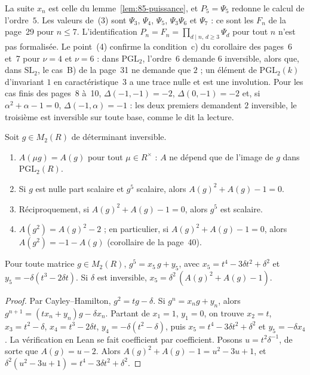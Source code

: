 \begin{remarque}
La suite $x_n$ est celle du lemme~\ref{lem:85-puissance}, et $P_5 = \Psi_5$ redonne le calcul de l'ordre~$5$. Les valeurs de~(3) sont $\Psi_3$, $\Psi_4$, $\Psi_5$, $\Psi_3\Psi_6$ et $\Psi_7$ : ce sont les $F_n$ de la page~29 pour $n \leq 7$. L'identification $P_n = F_n = \prod_{d \mid n,\, d \geq 3}\Psi_d$ pour tout $n$ n'est pas formalisée. Le point~(4) confirme la condition~c) du corollaire des pages~6 et~7 pour $\nu = 4$ et $\nu = 6$ : dans $\mathrm{PGL}_2$, l'ordre~$6$ demande $6$ inversible, alors que, dans $\mathrm{SL}_2$, le cas~B) de la page~31 ne demande que $2$ ; un élément de $\mathrm{PGL}_2(k)$ d'invariant $1$ en caractéristique~$3$ a une trace nulle et est une involution. Pour les cas finis des pages~8 à~10, $\Delta(-1, -1) = -2$, $\Delta(0, -1) = -2$ et, si $\alpha^2 + \alpha - 1 = 0$, $\Delta(-1, \alpha) = -1$ : les deux premiers demandent $2$ inversible, le troisième est inversible sur toute base, comme le dit la lecture.
\end{remarque}

\begin{enonce}
Soit $g \in M_2(R)$ de déterminant inversible.
\begin{enumerate}
\item $A(\mu g) = A(g)$ pour tout $\mu \in R^\times$ : $A$ ne dépend que de l'image de $g$ dans $\mathrm{PGL}_2(R)$.
\item Si $g$ est nulle part scalaire et $g^5$ scalaire, alors $A(g)^2 + A(g) - 1 = 0$.
\item Réciproquement, si $A(g)^2 + A(g) - 1 = 0$, alors $g^5$ est scalaire.
\item $A(g^2) = A(g)^2 - 2$ ; en particulier, si $A(g)^2 + A(g) - 1 = 0$, alors $A(g^2) = -1 - A(g)$ (corollaire de la page~40).
\end{enumerate}
\end{enonce}

\begin{lemme}\label{lem:85-puissance}
Pour toute matrice $g \in M_2(R)$, $g^5 = x_5\, g + y_5$, avec $x_5 = t^4 - 3\delta t^2 + \delta^2$ et $y_5 = -\delta(t^3 - 2\delta t)$. Si $\delta$ est inversible, $x_5 = \delta^2\,(A(g)^2 + A(g) - 1)$.
\end{lemme}

\begin{proof}
Par Cayley--Hamilton, $g^2 = t g - \delta$. Si $g^n = x_n g + y_n$, alors $g^{n+1} = (t x_n + y_n) g - \delta x_n$. Partant de $x_1 = 1$, $y_1 = 0$, on trouve $x_2 = t$, $x_3 = t^2 - \delta$, $x_4 = t^3 - 2\delta t$, $y_4 = -\delta(t^2 - \delta)$, puis $x_5 = t^4 - 3\delta t^2 + \delta^2$ et $y_5 = -\delta x_4$. La vérification en Lean se fait coefficient par coefficient. Posons $u = t^2\delta^{-1}$, de sorte que $A(g) = u - 2$. Alors $A(g)^2 + A(g) - 1 = u^2 - 3u + 1$, et $\delta^2(u^2 - 3u + 1) = t^4 - 3\delta t^2 + \delta^2$.
\end{proof}

